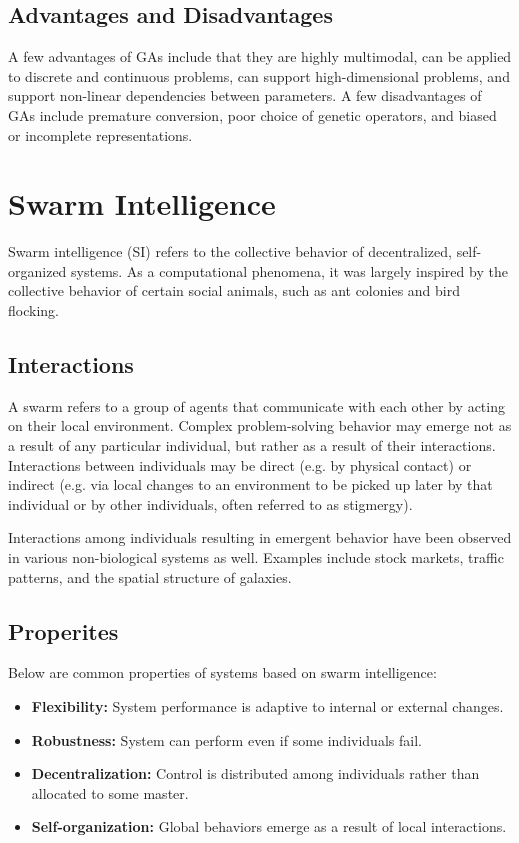 \documentclass[12pt,titlepage]{article}
\let\stdsection\section
\renewcommand\section{\clearpage\stdsection}
\begin{document}
    \subsection{Advantages and Disadvantages}
      A few advantages of GAs include that they are highly multimodal, can be applied to discrete and continuous problems, can support high-dimensional
      problems, and support non-linear dependencies between parameters. A few disadvantages of GAs include premature conversion, poor choice of genetic
      operators, and biased or incomplete representations.

  \section{Swarm Intelligence}

    Swarm intelligence (SI) refers to the collective behavior of decentralized, self-organized systems. As a computational phenomena, it was largely
    inspired by the collective behavior of certain social animals, such as ant colonies and bird flocking.

    \subsection{Interactions}
      A swarm refers to a group of agents that communicate with each other by acting on their local environment. Complex problem-solving behavior may
      emerge not as a result of any particular individual, but rather as a result of their interactions. Interactions between individuals may be direct
      (e.g. by physical contact) or indirect (e.g. via local changes to an environment to be picked up later by that individual or by other individuals,
      often referred to as stigmergy).

      Interactions among individuals resulting in emergent behavior have been observed in various non-biological systems as well. Examples include
      stock markets, traffic patterns, and the spatial structure of galaxies.

    \subsection{Properites}
      Below are common properties of systems based on swarm intelligence:
      \begin{itemize}
        \item \textbf{Flexibility:} System performance is adaptive to internal or external changes.
        \item \textbf{Robustness:} System can perform even if some individuals fail.
        \item \textbf{Decentralization:} Control is distributed among individuals rather than allocated to some master.
        \item \textbf{Self-organization:} Global behaviors emerge as a result of local interactions.
      \end{itemize}
\end{document}
